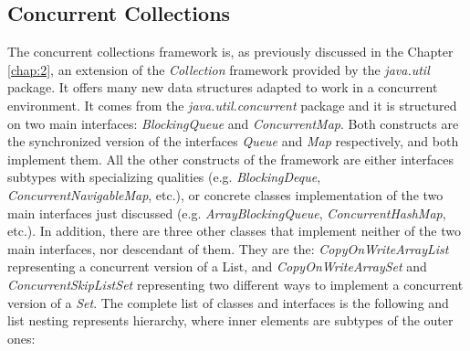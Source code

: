 \documentclass[]{usiinfthesis}
\begin{document}
\subsection{Concurrent Collections}
The concurrent collections framework is, as previously discussed in the Chapter \ref{chap:2}, an extension of the \textit{Collection} framework provided by the \textit{java.util} package. It offers many new data structures adapted to work in a concurrent environment. It comes from the \textit{java.util.concurrent} package and it is structured on two main interfaces: \textit{BlockingQueue} and \textit{ConcurrentMap}. Both constructs are the synchronized version of the interfaces \textit{Queue} and \textit{Map} respectively, and both implement them. All the other constructs of the framework are either interfaces subtypes with specializing qualities (e.g. \textit{BlockingDeque}, \textit{ConcurrentNavigableMap}, etc.), or concrete classes implementation of the two main interfaces just discussed (e.g. \textit{ArrayBlockingQueue}, \textit{ConcurrentHashMap}, etc.).  In addition, there are three other classes that implement neither of the two main interfaces, nor descendant of them. They are the: \textit{CopyOnWriteArrayList} representing a concurrent version of a List, and \textit{CopyOnWriteArraySet} and \textit{
ConcurrentSkipListSet} representing two different ways to implement a concurrent version of a \textit{Set}. 
The complete list of classes and interfaces is the following and list nesting represents hierarchy, where inner elements are subtypes of the outer ones:
\end{document}
